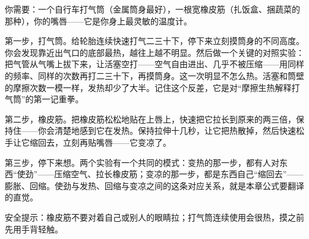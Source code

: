 \begin{experiment}[打气筒与一根橡皮筋]
你需要：一个自行车打气筒（金属筒身最好），一根宽橡皮筋（扎饭盒、捆蔬菜的那种），你的嘴唇——它是你身上最灵敏的温度计。

第一步，打气筒。给轮胎连续快速打气二三十下，停下来立刻摸筒身的不同高度。你会发现靠近出气口的底部最热，越往上越不明显。然后做一个关键的对照实验：把气管从气嘴上拔下来，让活塞空打——空气自由进出、几乎不被压缩——用同样的频率、同样的次数再打二三十下，再摸筒身。这一次明显不怎么热。活塞和筒壁的摩擦次数一模一样，发热却少了大半。记住这个反差，它是对“摩擦生热解释打气筒”的第一记重拳。

第二步，橡皮筋。把橡皮筋松松地贴在上唇上，快速把它拉长到原来的两三倍，保持住——你会清楚地感到它在发热。保持拉伸十几秒，让它把热散掉，然后快速松手让它缩回去，立刻再贴嘴唇——它变凉了。

第三步，停下来想。两个实验有一个共同的模式：变热的那一步，都有人对东西“使劲”——压缩空气、拉长橡皮筋；变凉的那一步，都是东西自己“缩回去”——膨胀、回缩。使劲与发热、回缩与变凉之间的这条对应关系，就是本章公式要翻译的直觉。

安全提示：橡皮筋不要对着自己或别人的眼睛拉；打气筒连续使用会很热，摸之前先用手背轻触。
\end{experiment}


